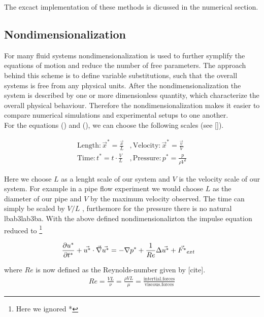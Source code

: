 {\begin{description}
\end{description}

The excact implementation of these methods is dicussed in the numerical section.

\subsection{Nondimensionalization}

For many fluid systems nondimensionalization is used to further symplify the equations of motion and reduce the number of free parameters.
The approach behind this scheme is to define variable substitutions, such that the overall systems is free from any physical units.
After the nondimensionalization the system is described by one or more dimensionless quantity, which characterize the overall physical behaviour.
Therefore the nondimensionalization makes it easier to compare numerical simulations and experimental setups to one another.\\
For the equations () and (), we can choose the following scales (see []).

\begin{align}
    \mathrm{Length}  : \vec{x}^* = \frac{\vec{x}}{L}  &, \mathrm{Velocity}: \vec{x}^* = \frac{\vec{v}}{V}\\
    \mathrm{Time}    : t^* = t \cdot \frac{V}{L}      &, \mathrm{Pressure}: p^* = \frac{p}{\rho V^2}
\end{align}

Here we choose $L$ as a lenght scale of our system and $V$ is the velocity scale of our system.
For example in a pipe flow experiment we would choose $L$ as the diameter of our pipe and $V$ by the maximum velocity observed.
The time can simply be scaled  by $V/L$ , furthemore for the pressure there is no natural lbab3lab3ba.
With the above defined nondimensionalizton the impulse equation reduced to \footnote{Here we ignored *}

\begin{align}
    \pdn[u^*]{t^*} + \vec{u^*} \cdot \vec{\nabla} \vec{u^*} &= -\nabla p^* + \frac{1}{Re} \Delta \vec{u^*} + \vec{F^*}_{ext}
\end{align}

where $Re$ is now defined as the Reynolds-number given by [cite].
\begin{align}
    Re = \frac{VL}{\nu} = \frac{\rho VL}{\mu} = \frac{\mathrm{intertial.forces}}{\mathrm{viscous.forces}}
\end{align}

}
